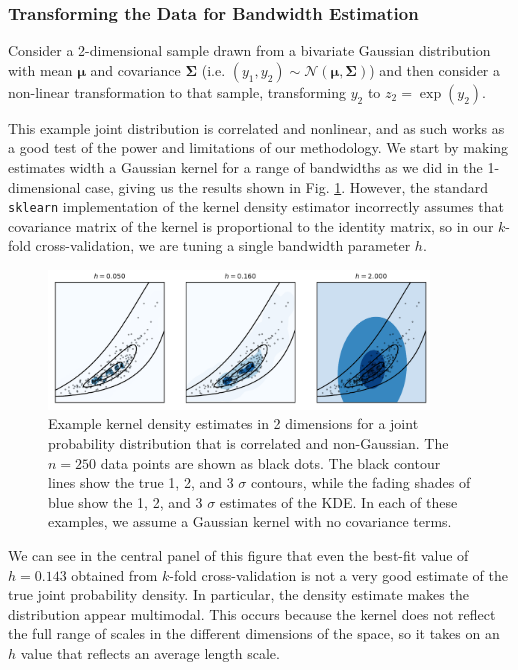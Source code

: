 \subsubsection{Transforming the Data for Bandwidth Estimation}
Consider a 2-dimensional sample drawn from a bivariate Gaussian distribution with mean $\bm{\mu}$ and covariance $\bm{\Sigma}$ (i.e. $(y_1, y_2)\sim\mathcal{N}(\bm{\mu}, \bm{\Sigma})$) and then consider a non-linear transformation to that sample, transforming $y_2$ to $z_2 = \exp(y_2)$. 

This example joint distribution is correlated and nonlinear, and as such works as a good test of the power and limitations of our methodology. We start by making estimates width a Gaussian kernel for a range of bandwidths as we did in the 1-dimensional case, giving us the results shown in Fig. \ref{fig:2d_scatter_unscaled}. However, the standard \verb|sklearn| implementation of the kernel density estimator incorrectly assumes that covariance matrix of the kernel is proportional to the identity matrix, so in our $k$-fold cross-validation, we are tuning a single bandwidth parameter $h$.

\begin{figure}
    \centering
    \includegraphics[width=0.9\textwidth]{figures/snemo_kde/2d_scatter_no_scaling.pdf}
    \caption{Example kernel density estimates in 2 dimensions for a joint probability distribution that is correlated and non-Gaussian. The $n=250$ data points are shown as black dots. The black contour lines show the true 1, 2, and 3 $\sigma$ contours, while the fading shades of blue show the 1, 2, and 3 $\sigma$ estimates of the KDE. In each of these examples, we assume a Gaussian kernel with no covariance terms.}
    \label{fig:2d_scatter_unscaled}
\end{figure}

We can see in the central panel of this figure that even the best-fit value of $h=0.143$ obtained from $k$-fold cross-validation is not a very good estimate of the true joint probability density. In particular, the density estimate makes the distribution appear multimodal. This occurs because the kernel does not reflect the full range of scales in the different dimensions of the space, so it takes on an $h$ value that reflects an average length scale.

